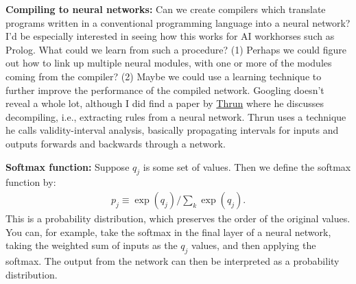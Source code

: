 \documentclass[12pt]{article}
\newcommand{\link}[2]{\href{#1}{#2}}
\begin{document}
\textbf{Compiling to neural networks:} Can we create compilers which
translate programs written in a conventional programming language into
a neural network?  I'd be especially interested in seeing how this
works for AI workhorses such as Prolog.  What could we learn from such
a procedure?  (1) Perhaps we could figure out how to link up multiple
neural modules, with one or more of the modules coming from the
compiler? (2) Maybe we could use a learning technique to further
improve the performance of the compiled network.  Googling doesn't
reveal a whole lot, although I did find a paper by
\link{http://scholar.google.ca/scholar?cluster=10518384657895134615\&hl=en\&as\_sdt=0,5}{Thrun}
where he discusses decompiling, i.e., extracting rules from a neural
network.  Thrun uses a technique he calls validity-interval analysis,
basically propagating intervals for inputs and outputs forwards and
backwards through a network.

\textbf{Softmax function:} Suppose $q_j$ is some set of values.  Then
  we define the softmax function by:
\begin{eqnarray}
p_j \equiv \exp(q_j)/\sum_k \exp(q_j).
\end{eqnarray}
This is a probability distribution, which preserves the order of the
original values.  You can, for example, take the softmax in the final
layer of a neural network, taking the weighted sum of inputs as the
$q_j$ values, and then applying the softmax.  The output from the
network can then be interpreted as a probability distribution.
\end{document}
